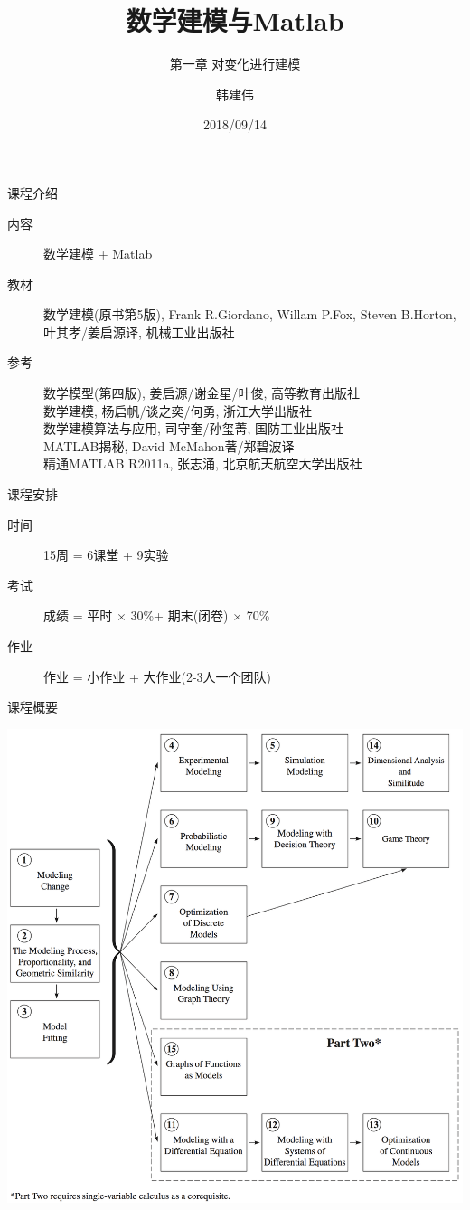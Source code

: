 \documentclass[UTF8, mathserif]{ctexbeamer}
\title{数学建模与Matlab}
\subtitle{第一章 对变化进行建模}
\author{韩建伟}
\institute{
  计算机学院
}
\date{2018/09/14}
\begin{document}
\begin{frame}[plain]
  \titlepage{}
\end{frame}

\begin{frame}{课程介绍}

\begin{description}
\item[内容] 数学建模 + Matlab
\item[教材] 数学建模(原书第5版), Frank R.Giordano, Willam P.Fox, Steven B.Horton, 叶其孝/姜启源译, 机械工业出版社
\item[参考] 数学模型(第四版), 姜启源/谢金星/叶俊, 高等教育出版社\\
  数学建模, 杨启帆/谈之奕/何勇, 浙江大学出版社\\
  数学建模算法与应用, 司守奎/孙玺菁, 国防工业出版社 \\
  MATLAB揭秘, David McMahon著/郑碧波译\\
  精通MATLAB R2011a, 张志涌, 北京航天航空大学出版社
\end{description}
  
\end{frame}

\begin{frame}{课程安排}
  \begin{description}
  \item[时间] 15周 = 6课堂 + 9实验
  \item[考试] 成绩 = 平时 $\times$ 30\%+ 期末(闭卷) $\times$ 70\%
  \item[作业] 作业 = 小作业 + 大作业(2-3人一个团队)
  \end{description}
\end{frame}

\begin{frame}{课程概要}
  \begin{center}
    \includegraphics[height=.8\textheight{}]{book-overview.png}
  \end{center}
\end{frame}
\end{document}
